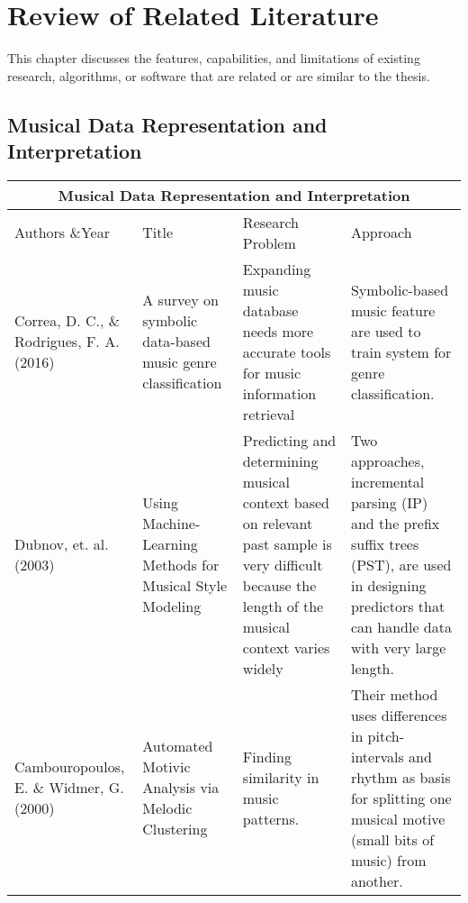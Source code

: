 %
%
%                 

\chapter{Review of Related Literature}
\label{sec:relatedlit}
This chapter discusses the features, capabilities, and limitations of existing research, algorithms, or software that are related or are similar to the thesis.

\section{Musical Data Representation and Interpretation}
 
\begin{center}
\begin{tabular}{ |p{3cm}|p{3cm}|p{3cm}|p{3cm}| }
 \hline
 \multicolumn{4}{|c|}{Musical Data Representation and Interpretation} \\
 \hline
 Authors \&Year &Title&Research Problem&Approach\\
 \hline
 Correa, D. C., \& Rodrigues, F. A. (2016)& A survey on symbolic data-based music genre classification & Expanding music database needs more accurate tools for music information retrieval & Symbolic-based music feature are used to train system for genre classification.\\
\hline
 Dubnov, et. al. (2003)& Using Machine-Learning Methods for Musical Style Modeling & Predicting and determining musical context based on relevant past sample is very difficult because the length of the musical context varies widely & Two approaches, incremental parsing (IP) and the prefix suffix trees (PST), are used in designing predictors that can handle data with very large length.\\
\hline
  Cambouropoulos, E. \& Widmer, G. (2000)& Automated Motivic Analysis via Melodic Clustering & Finding similarity in music patterns. & Their method uses differences in pitch-intervals and rhythm as basis for splitting one musical motive (small bits of music) from another.\\
 \hline
\end{tabular}
\end{center}

